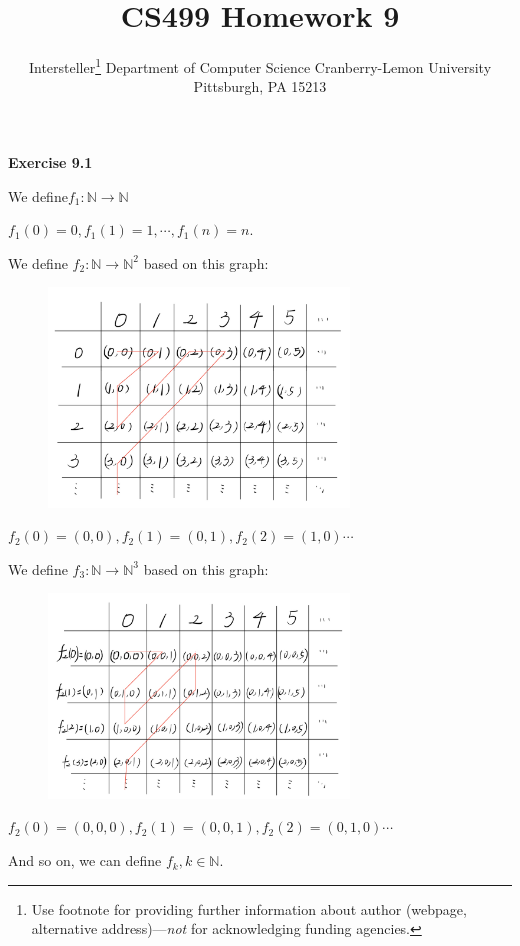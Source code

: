 \documentclass{article} %
\title{CS499 Homework 9}
\author{
	Intersteller\thanks{ Use footnote for providing further information
		about author (webpage, alternative address)---\emph{not} for acknowledging
		funding agencies.}
	Department of Computer Science
	Cranberry-Lemon University
	Pittsburgh, PA 15213
}
\begin{document}
	
	
	\maketitle
	
	
	\textbf{Exercise 9.1}\par
    We define$f_1:\mathbb{N}\rightarrow \mathbb{N}$\par
    $f_1\left(0\right)=0,
    f_1\left(1\right)=1,
    \cdots,
    f_1\left(n\right)=n.
    $\par
    We define $f_2:\mathbb{N}\rightarrow \mathbb{N}^2$ based on this graph:
    \begin{figure}[H]
  	\centering
  	\includegraphics[width=8cm]{9_1_1.png}
  	\caption{}
  	\label{}
  	\end{figure}
    $f_2\left(0\right)=\left(0,0\right),f_2\left(1\right)=\left(0,1\right),f_2\left(2\right)=\left(1,0\right)\cdots$\par
    We define $f_3:\mathbb{N}\rightarrow \mathbb{N}^3$ based on this graph:
   \begin{figure}[H]
  	\centering
  	\includegraphics[width=8cm]{9_1_2.png}
  	\caption{}
  	\label{}
  	\end{figure}
    $f_2\left(0\right)=\left(0,0,0\right),f_2\left(1\right)=\left(0,0,1\right),f_2\left(2\right)=\left(0,1,0\right)\cdots$\par
    And so on, we can define $f_k,k\in \mathbb{N}$.
\end{document}
